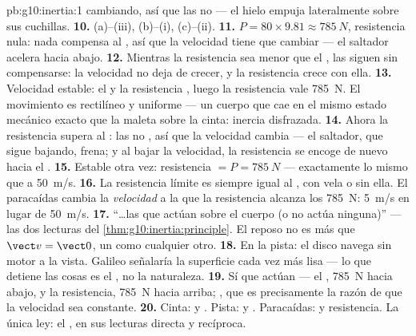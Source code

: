 \begin{solution}{pb:g10:inertia:1}
cambiando, así que las  no  --- el hielo empuja
lateralmente sobre sus cuchillas.
\textbf{10.} (a)--(iii), (b)--(i), (c)--(ii).
\textbf{11.}  $P = 80 \times 9.81 \approx \qty{785}{N}$,
resistencia nula: nada compensa al , así que la velocidad tiene que
cambiar --- el saltador acelera hacia abajo.
\textbf{12.} Mientras la resistencia sea menor que el , las 
siguen sin compensarse: la velocidad no deja de crecer, y la resistencia
crece con ella.
\textbf{13.} Velocidad estable: el  y la resistencia ,
luego la resistencia vale \qty{785}{N}. El movimiento es rectilíneo y
uniforme --- un cuerpo que cae en el mismo estado mecánico exacto que la
maleta sobre la cinta: inercia disfrazada.
\textbf{14.} Ahora la resistencia supera al : las  no , así que la velocidad cambia --- el saltador, que sigue
bajando, frena; y al bajar la velocidad, la resistencia se encoge de
nuevo hacia el .
\textbf{15.} Estable otra vez: resistencia $= P = \qty{785}{N}$ ---
exactamente lo mismo que a \qty{50}{m/s}.
\textbf{16.} La resistencia límite es siempre igual al , con vela o
sin ella. El paracaídas cambia la \emph{velocidad} a la que la
resistencia alcanza los \qty{785}{N}: \qty{5}{m/s} en lugar de
\qty{50}{m/s}.
\textbf{17.} ``\dots las  que actúan sobre el cuerpo  (o no actúa ninguna)'' --- las dos lecturas del
\cref{thm:g10:inertia:principle}. El reposo no es más que
$\vect v = \vect 0$, un  como cualquier
otro.
\textbf{18.} En la pista: el disco navega sin motor a la vista. Galileo
señalaría la superficie cada vez más lisa --- lo que detiene las cosas
es el , no la naturaleza.
\textbf{19.} Sí que actúan  --- el , \qty{785}{N} hacia
abajo, y la resistencia, \qty{785}{N} hacia arriba; \emph{},
que es precisamente la razón de que la velocidad sea constante.
\textbf{20.} Cinta:  y . Pista:  y . Paracaídas:  y resistencia. La única ley: el , en sus lecturas directa y recíproca.
\end{solution}
